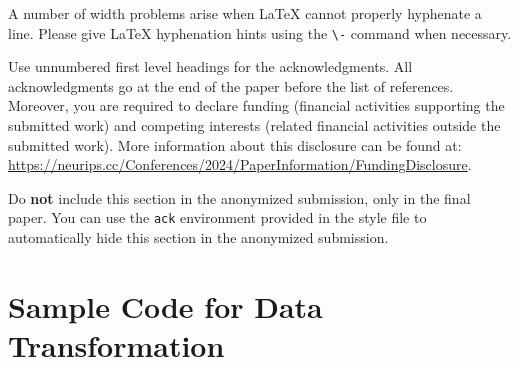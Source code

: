 \documentclass{article}
\begin{document}
	
	A number of width problems arise when \LaTeX{} cannot properly hyphenate a
	line. Please give LaTeX hyphenation hints using the \verb+\-+ command when
	necessary.
	
	\begin{ack}
		Use unnumbered first level headings for the acknowledgments. All acknowledgments
		go at the end of the paper before the list of references. Moreover, you are required to declare
		funding (financial activities supporting the submitted work) and competing interests (related financial activities outside the submitted work).
		More information about this disclosure can be found at: \url{https://neurips.cc/Conferences/2024/PaperInformation/FundingDisclosure}.
		
		
		Do {\bf not} include this section in the anonymized submission, only in the final paper. You can use the \texttt{ack} environment provided in the style file to automatically hide this section in the anonymized submission.
	\end{ack}	
	
	
	
	
	
	\newpage
	\appendix
	
	\section{Sample Code for Data Transformation}
	\label{appendix:data_trans}
	
\end{document}
